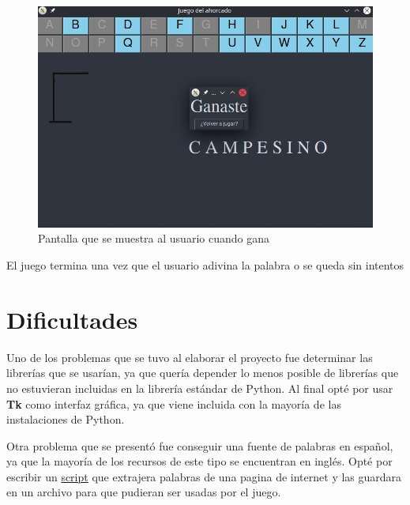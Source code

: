 \documentclass{article}
\begin{document}
\begin{figure}[h]
\includegraphics[width=\textwidth]{win}
\caption{Pantalla que se muestra al usuario cuando gana}
\label{fig:win}
\end{figure}

El juego termina una vez que el usuario adivina la palabra o se queda sin intentos

\section{Dificultades}

Uno de los problemas que se tuvo al elaborar el proyecto fue determinar las librerías que se usarían, ya que quería depender lo menos posible de librerías que no estuvieran incluidas en la librería estándar de Python. Al final opté por usar \textbf{Tk} como interfaz gráfica, ya que viene incluida con la mayoría de las instalaciones de Python.

Otra problema que se presentó fue conseguir una fuente de palabras en español, ya que la mayoría de los recursos de este tipo se encuentran en inglés. 
Opté por escribir un \href{https://github.com/sebastianmarines/TC1028.1/blob/master/scraper.exs}{script} que extrajera palabras de una pagina de internet y las guardara en un archivo para que pudieran ser usadas por el juego.
\end{document}
